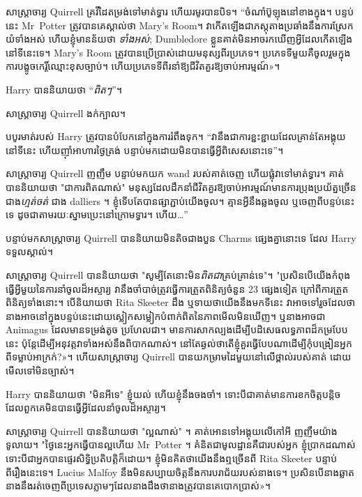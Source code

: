 {{{សាស្ត្រាចារ្យ Quirrell គ្រវីដៃ​តម្រង់​ទៅ​មាត់​ទ្វារ ហើយ​រមូរ​បាន​បិទ។ “ចំណាំ​ប៊ូឡុង​នៅ​ខាង​ក្នុង។ បន្ទប់នេះ Mr~Potter ត្រូវបានគេស្គាល់ថា Mary's Room។ វាកើតឡើងជាភស្តុតាងប្រឆាំងនឹងការស្រែកយំទាំងអស់ ហើយខ្ញុំមានន័យថា \emph{ទាំងអស់}; Dumbledore ខ្លួនគាត់មិនអាចរកឃើញអ្វីដែលកើតឡើងនៅទីនេះទេ។ Mary's Room ត្រូវបានប្រើប្រាស់ដោយមនុស្សពីរប្រភេទ។ ប្រភេទទីមួយគឺចូលរួមក្នុងការបង្ខូចកេរ្តិ៍ឈ្មោះខុសច្បាប់។ ហើយប្រភេទទីពីរនាំឱ្យជីវិតគួរឱ្យចាប់អារម្មណ៍»។

Harry បាននិយាយថា “\emph{ពិតៗ}”។

សាស្ត្រាចារ្យ Quirrell ងក់ក្បាល។

បបូរមាត់របស់ Harry ត្រូវបានបំបែកនៅក្នុងការរំពឹងទុក។ “វា​នឹង​ជា​ការ​ខ្ជះខ្ជាយ​ដែល​គ្រាន់តែ​អង្គុយ​នៅទីនេះ ហើយ​ញ៉ាំ​អាហារ​ថ្ងៃត្រង់ បន្ទាប់មក​ដោយ​មិន​បានធ្វើ​អ្វី​ពិសេស​នោះ​ទេ​”​។

សាស្រ្តាចារ្យ Quirrell ញញឹម បន្ទាប់មកយក wand របស់គាត់ចេញ ហើយផ្លុំវាទៅមាត់ទ្វារ។ គាត់បាននិយាយថា "ជាការពិតណាស់" មនុស្សដែលដឹកនាំជីវិតគួរឱ្យចាប់អារម្មណ៍មានការប្រុងប្រយ័ត្នច្រើនជាង\emph{ហ្មត់ចត់} ជាង dalliers ។ ខ្ញុំទើបតែបានផ្សាភ្ជាប់យើងចូល។ គ្មានអ្វីនឹងឆ្លងចូល ឬចេញពីបន្ទប់នេះទេ ដូចជាតាមរយៈស្នាមប្រេះនៅក្រោមទ្វារ។ ហើយ…”

បន្ទាប់មកសាស្រ្តាចារ្យ Quirrell បាននិយាយមិនតិចជាងបួន Charms ផ្សេងគ្នានោះទេ ដែល Harry ទទួលស្គាល់។

សាស្រ្តាចារ្យ Quirrell បាននិយាយថា "សូម្បីតែនោះមិន\emph{{ពិតជា}}គ្រប់គ្រាន់ទេ"។ "ប្រសិនបើយើងកំពុងធ្វើអ្វីមួយនៃការនាំចូលដ៏អស្ចារ្យ វានឹងចាំបាច់ត្រូវធ្វើការត្រួតពិនិត្យចំនួន 23 ផ្សេងទៀត ក្រៅពីការត្រួតពិនិត្យទាំងនោះ។ បើនិយាយថា Rita Skeeter ដឹង ឬទាយថាយើងនឹងមកទីនេះ វាអាចទៅរួចដែលថានាងអាចនៅក្នុងបន្ទប់នេះដោយស្លៀកសម្លៀកបំពាក់ពិតនៃភាពមើលមិនឃើញ។ ឬនាងអាចជា Animagus ដែលមានទម្រង់តូច ប្រហែលជា។ មាន​ការ​សាកល្បង​ដើម្បី​បដិសេធ​លទ្ធភាព​ដ៏​កម្រ​បែប​នេះ ប៉ុន្តែ​ដើម្បី​អនុវត្ត​វា​ទាំងអស់​នឹង​ពិបាក​ណាស់។ នៅ​តែ​ឆ្ងល់​ថា​តើ​ខ្ញុំ​គួរ​ធ្វើ​បែប​ណា​ដើម្បី​កុំ​បង្រៀន​អ្នក​ពី​ទម្លាប់​អាក្រក់?»។ ហើយសាស្រ្តាចារ្យ Quirrell បានយកម្រាមដៃមួយនៅលើថ្ពាល់របស់គាត់ ដោយមើលទៅមិនច្បាស់។

Harry បាននិយាយថា "មិនអីទេ" ខ្ញុំយល់ ហើយខ្ញុំនឹងចងចាំ។ ទោះបីជាគាត់មានការខកចិត្តបន្តិចដែលពួកគេមិនបានធ្វើអ្វីដែលនាំចូលដ៏អស្ចារ្យ។

សាស្រ្តាចារ្យ Quirrell បាននិយាយថា "ល្អណាស់" ។ គាត់​អោន​ទៅ​អង្គុយ​លើ​កៅអី ញញឹម​យ៉ាង​ទូលាយ។ "ថ្ងៃនេះអ្នកធ្វើបានល្អហើយ Mr~Potter ។ គំនិតជាមូលដ្ឋានគឺជារបស់អ្នក ខ្ញុំប្រាកដណាស់ ទោះបីជាអ្នកបានផ្ទេរសិទ្ធិប្រតិបត្តិក៏ដោយ។ ខ្ញុំមិនគិតថាយើងនឹងឮច្រើនពី Rita Skeeter បន្ទាប់ពីរឿងនេះទេ។ Lucius Malfoy នឹងមិនសប្បាយចិត្តនឹងការបរាជ័យរបស់នាងទេ។ ប្រសិន​បើ​នាង​ឆ្លាត នាង​នឹង​រត់​ចេញ​ពី​ប្រទេស​ភ្លាមៗ​ដែល​នាង​ដឹង​ថា​នាង​ត្រូវ​បាន​គេ​បោក​ប្រាស់»។

}}}
